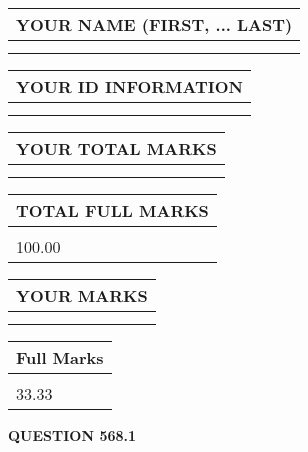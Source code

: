 \documentclass{ctexart}
\begin{document}
   
   
   
\newpage 
\setcounter{page}{ 
   568001 } 
   
   
   
   
\noindent\begin{tabular}{|l|}
\hline
YOUR NAME (FIRST, ... LAST)  \\
\hline
 \\ 
 \\ 
\hline
\end{tabular}
\hspace{0.05in} \begin{tabular}{|l|}
\hline
 YOUR   ID   INFORMATION  \\
\hline
 \\ 
 \\ 
\hline
\end{tabular}
   
   
\vspace{0.2in}\noindent\begin{tabular}{|l|}
\hline
YOUR TOTAL MARKS  \\
\hline
 \\ 
 \\ 
\hline
\end{tabular}
\hspace{0.05in} \begin{tabular}{|l|}
\hline
TOTAL FULL MARKS  \\
\hline
 \\ 
100.00 \\
\hline
\end{tabular}
   
   
 \vspace{0.2in}
 
 
 
 
   
   
  
\vspace{0.2in}
  
\noindent\begin{tabular}{|l|}
\hline
 YOUR MARKS  \\
\hline
 \\ 
 \\ 
\hline
\end{tabular}
\hspace{0.05in} \begin{tabular}{|l|}
\hline
 Full Marks  \\
\hline
 \\ 
33.33 \\
\hline
\end{tabular}
{\textbf{\Large{QUESTION
568.1 
}}}
  
\end{document}
